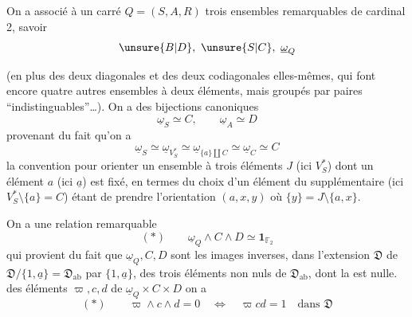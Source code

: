 On a associé à un carré $Q=(S,A,R)$ trois ensembles remarquables de cardinal 2,
savoir
\[
\unsure{B|D},\ \unsure{S|C},\ \underline{\omega}_Q
\]

(en plus des deux diagonales et des deux codiagonales elles-mêmes,
qui font encore quatre autres ensembles à deux éléments, mais groupés par
paires ``indistinguables''\ldots).
On a des bijections canoniques
\[
 \underline{\omega}_S\simeq C,\qquad \underline{\omega}_A\simeq D
\]
provenant du fait qu'on a
\[
 \underline{\omega}_S\simeq\underline{\omega}_{V_S^*}
 \simeq\underline{\omega}_{\{a\}\amalg C}
 \simeq\underline{\omega}_C\simeq C
\]
la convention pour orienter un ensemble à trois éléments $J$ (ici $V_S^*$)
dont un élément $a$ (ici $\underline{a}$) est fixé, en termes du choix d'un
élément  du supplémentaire (ici $V_S^*\setminus\{a\}=C$)
étant de prendre l'orientation $(a,x,y)$
où $\{y\}=J\setminus\{a,x\}$.

On a une relation remarquable
\[
(*)\qquad \underline{\omega}_Q\wedge C\wedge D\simeq\mathbf{1}_{\mathbb{F}_2}
\]
qui provient du fait que
$\underline{\omega}_Q,C,D$ sont les images inverses,
dans l'extension $\mathfrak{D}$ de
$\mathfrak{D}/\{1,\underline{a}\}=\mathfrak{D}_{\mathrm{ab}}$
par $\{1,\underline{a}\}$, des trois éléments non nuls de
$\mathfrak{D}_{\mathrm{ab}}$, dont la
 est nulle.
 des éléments $\varpi,c,d$ de
$\underline{\omega}_Q\times C\times D$  on a
\[
(*)\qquad
 \varpi\wedge c\wedge d=0
 \quad\Longleftrightarrow\quad
 \varpi c d=1\quad\text{dans }\mathfrak{D}
\]
\margin{[Attention, cette relation serait inversée si on faisait une
transposition dans l'ordre des facteurs --- il y a donc
\deleted{\unsure{une}} dans \deleted{\unsure{ce}} le choix de l'iso.
\unsure{ici} une question de convention.}


